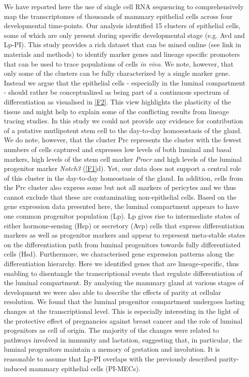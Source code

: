 \documentclass[titlepage, 12pt, oneside]{amsart}
\begin{document}
We have reported here the use of single cell RNA sequencing to comprehensively map the transcriptomes of thousands of mammary epithelial cells across four developmental time-points.
Our analysis identified 15 clusters of epithelial cells, some of which are only present during specific developmental stage (e.g. Avd and Lp-PI).
This study provides a rich dataset that can be mined online (see link in materials and methods) to identify marker genes and lineage specific promoters that can be used to trace populations of cells \textit{in vivo}.
We note, however, that only some of the clusters can be fully characterized by a single marker gene.
Instead we argue that the epithelial cells - especially in the luminal compartment - should rather be conceptualized as being part of a continuous spectrum of differentiation as visualised in \autoref{F2}.
This view highlights the plasticity of the tissue and might help to explain some of the conflicting results from lineage tracing studies\autocite{Inman2015}.
In this study we could not provide any evidence for contribution of a putative mutlipotent stem cell to the day-to-day homoeostasis of the gland.
We do note, however, that the cluster Prc represents the cluster with the fewest numbers of cells captured and expresses low levels of both luminal and basal markers, high levels of the stem cell marker \textit{Procr}\autocite{Wang2015} and high levels of the luminal progenitor marker \textit{Notch3}\autocite{Lafkas2013} (\autoref{F1}d).
Yet, our data does not support a central role of this cluster in the day-to-day homeostasis of the gland. 
In addition, cells from the Prc cluster also express some but not all markers of pericytes and we thus cannot exclude that these are contaminating non-epithelial cells. 
Based on the gene expression data presented here, the luminal compartment appears to have one common progenitor population (Lp).
Lp gives rise to intermediate states of either hormone-sensing (Hsp) or secretory (Avp) cells that express differentiation markers as well as progenitor markers and appear to represent meta-stable states on the differentiation path from luminal progenitors towards fully differentiated cells (Hsd).
Furthermore, we characterised gene expression patterns along the differentiation hierarchy.
Here we identified genes that are lineage-specific, thus enabling to disentangle the transcriptional events that regulate differentiation of the luminal compartment.
By analysing the mammary gland at various stages of development we were also able to describe the effects of parity at cellular resolution.
We found that the luminal progenitor compartment undergoes lasting changes at the transcriptional level.
This is especially interesting in the light of the protective effect of pregnancies against breast cancer and the role of luminal progenitors as cell of origin.
The majority of the changes were related to pathways involved in immunity and lactation, suggesting that, in particular, the luminal progenitors maintain a memory of gestation and involution.
It is reasonable to assume that Lp-PI overlaps with the previously described parity-induced mammary epithelial cells (PI-MECs)\autocite{Wagner2002}.
\end{document}
